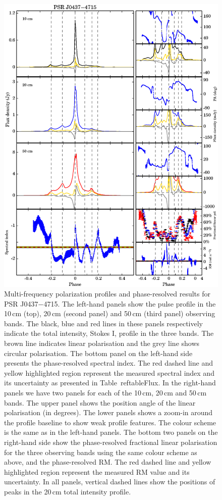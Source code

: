 \documentclass[useAMS,usenatbib]{mn2e}
\begin{document}
\begin{appendix}
\begin{figure}
\begin{center}
\includegraphics[width=6 in]{0437.ps}
\caption{Multi-frequency polarization profiles and phase-resolved results for 
PSR J0437$-$4715. The left-hand panels show the pulse profile in the 10\,cm (top), 20\,cm 
(second panel) and 50\,cm (third panel) observing bands. The black, blue and red 
lines in these panels respectively indicate the total intensity, Stokes I, profile in the three bands. 
The brown line indicates linear polarisation and the grey line shows circular polarisation. 
The bottom panel on the left-hand side presents the phase-resolved spectral index.   
The red dashed line and yellow highlighted region represent the measured spectral 
index and its uncertainty as presented in Table~ref{tableFlux}.
%
In the right-hand panels we have two panels for each of the 10\,cm, 20\,cm and 50\,cm bands. 
The upper panel shows the position angle of the linear polarisation (in degrees).
%
The lower panels shows a zoom-in around the profile baseline to show weak profile 
features. The colour scheme is the same as in the left-hand panels.   
%
The bottom two panels on the right-hand side show the phase-resolved fractional 
linear polarisation for the three observing bands using the same colour scheme as above, 
and the phase-resolved RM. The red dashed line and yellow highlighted region represent the 
measured RM value and its uncertainty. 
%
In all panels, vertical dashed lines show the positions of peaks in the 20\,cm total intensity profile.
}
\label{0437}
\end{center}
\end{figure}


\end{appendix}
\end{document}
